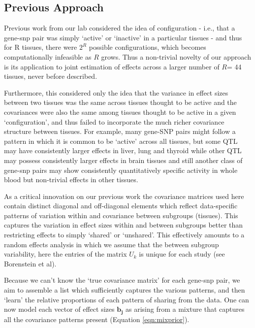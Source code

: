 \subsection{Previous Approach}
 
Previous work from our lab considered the idea of configuration - i.e., that a gene-snp pair was simply `active' or `inactive' in a particular tissues - and thus for R tissues, there were $2^{R}$ possible configurations, which becomes computationally infeasible as $R$ grows. Thus a non-trivial novelty of our approach is its application to joint estimation of effects across a larger number of $R$= 44 tissues, never before described.

Furthermore, this considered only the idea that the variance in effect sizes between two tissues was the same across tissues thought to be active and the covariances were also the same among tissues thought to be active in a given `configuration',  and thus failed to incorporate the much richer covariance structure between tissues. For example, many gene-SNP pairs might follow a pattern in which it is common to be `active' across all tissues, but some QTL may have consistently larger effects in liver, lung and thyroid while other QTL may possess consistently larger effects in brain tissues and still another class of gene-snp pairs may show consistently quantitatively specific activity in whole blood but non-trivial effects in other tissues. 

As a critical innovation on our previous work \cite{flutre_statistical_2013,wen_bayesian_2014} the covariance matrices used here contain distinct diagonal and off-diagonal elements which reflect data-specific patterns of variation within and covariance between subgroups (tissues). This captures the variation in effect sizes within and between subgroups better than restricting effects to simply `shared' or `unshared'. This effectively amounts to a random effects analysis in which we assume that the between subgroup variability, here the entries of the matrix $U_{k}$ is unique for each study (see Borenstein et al).

Because we can't know the `true covariance matrix' for each gene-snp pair, we aim to assemble a list which sufficiently captures the various patterns, and then `learn' the relative proportions of each pattern of sharing from the data. One can now model each vector of effect sizes $\bm{b_{j}}$ as arising from a mixture that captures all the covariance patterns present (Equation \ref{eqn:mixprior}).

